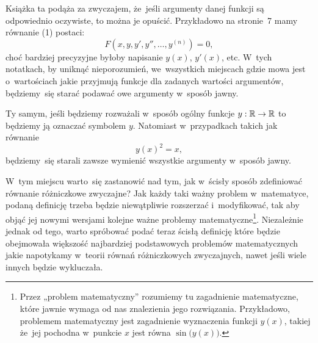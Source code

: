 \documentclass[a4paper,11pt]{article}
\begin{document}

\vspace{0em}

\noindent
Książka ta podąża za zwyczajem, że~jeśli argumenty danej funkcji są
odpowiednio oczywiste, to można je opuścić. Przykładowo na stronie~7
mamy równanie (1) postaci:
\begin{equation}
  \label{eq:Matwiejew-Metody-calkowania-ETC-01}
  F\left( x, y, y', y'', \ldots, y^{ ( n ) } \right) = 0,
\end{equation}
choć bardziej precyzyjne byłoby napisanie $y( x )$, $y'( x )$, etc. W~tych
notatkach, by uniknąć nieporozumień, we~wszystkich miejscach gdzie mowa jest
o~wartościach jakie przyjmują funkcje dla zadanych wartości argumentów,
będziemy~się starać podawać owe argumenty w~sposób jawny.

Ty samym, jeśli będziemy rozważali w~sposób ogólny funkcje
$y : \mathbb{R} \to \mathbb{R}$ to będziemy ją oznaczać symbolem $y$. Natomiast
w~przypadkach takich jak równanie
\begin{equation}
  \label{eq:Matwiejew-Metody-calkowania-ETC-02}
  y( x )^{ 2 } = x,
\end{equation}
będziemy~się starali zawsze wymienić wszystkie argumenty w~sposób jawny.

\vspace{\VerSpaceFour}











\vspace{0em}


\noindent
{} W~tym miejscu warto~się zastanowić nad tym, jak w~ścisły sposób
zdefiniować równanie różniczkowe zwyczajne? Jak każdy taki ważny
problem w~matematyce, podaną definicję trzeba będzie niewątpliwie rozszerzać
i~modyfikować, tak aby objąć jej nowymi wersjami kolejne ważne problemy
matematyczne\footnote{Przez „problem matematyczny” rozumiemy tu zagadnienie
  matematyczne, które jawnie wymaga od nas znalezienia jego rozwiązania.
  Przykładowo, problemem matematyczny jest zagadnienie wyznaczenia
  funkcji $y( x )$, takiej że~jej pochodna w~punkcie $x$ jest równa
  $\sin\!\big( y( x ) \big)$. }. Niezależnie jednak od tego, warto spróbować
podać teraz ścisłą definicję które będzie obejmowała większość najbardziej
podstawowych problemów matematycznych jakie napotykamy w~teorii równań
różniczkowych zwyczajnych, nawet jeśli wiele innych będzie wykluczała.
\end{document}
